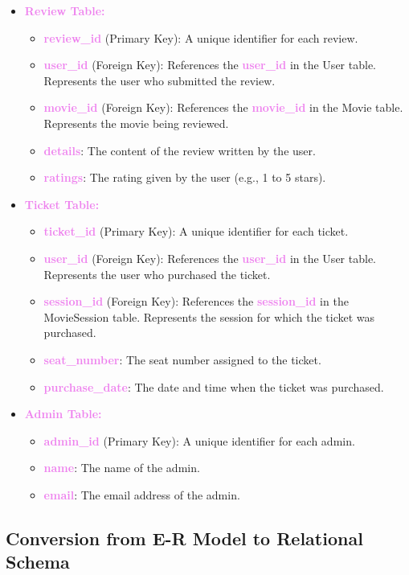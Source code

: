 \documentclass[a4paper,12pt]{article}  %
\renewcommand{\textbf}[1]{\textcolor{violet}{\bfseries #1}}
\begin{document}
\begin{itemize}
    \item \textbf{Review Table:}
    \begin{itemize}
        \item \textbf{review\_id} (Primary Key): A unique identifier for each review.
        \item \textbf{user\_id} (Foreign Key): References the \textbf{user\_id} in the User table. Represents the user who submitted the review.
        \item \textbf{movie\_id} (Foreign Key): References the \textbf{movie\_id} in the Movie table. Represents the movie being reviewed.
        \item \textbf{details}: The content of the review written by the user.
        \item \textbf{ratings}: The rating given by the user (e.g., 1 to 5 stars).
    \end{itemize}
    
    \item \textbf{Ticket Table:}
    \begin{itemize}
        \item \textbf{ticket\_id} (Primary Key): A unique identifier for each ticket.
        \item \textbf{user\_id} (Foreign Key): References the \textbf{user\_id} in the User table. Represents the user who purchased the ticket.
        \item \textbf{session\_id} (Foreign Key): References the \textbf{session\_id} in the MovieSession table. Represents the session for which the ticket was purchased.
        \item \textbf{seat\_number}: The seat number assigned to the ticket.
        \item \textbf{purchase\_date}: The date and time when the ticket was purchased.
    \end{itemize}
    
    \item \textbf{Admin Table:}
    \begin{itemize}
        \item \textbf{admin\_id} (Primary Key): A unique identifier for each admin.
        \item \textbf{name}: The name of the admin.
        \item \textbf{email}: The email address of the admin.
    \end{itemize}
\end{itemize}

\subsection{Conversion from E-R Model to Relational Schema}
\end{document}
